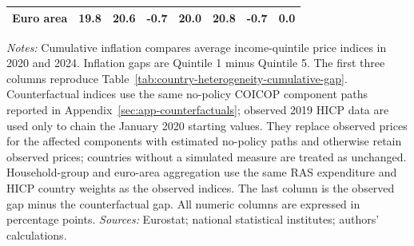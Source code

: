 \begin{table}[H]
{\begin{tabular}{lrrrrrrr}
\textbf{Euro area} & \textbf{19.8} & \textbf{20.6} & \textbf{-0.7} & \textbf{20.0} & \textbf{20.8} & \textbf{-0.7} & \textbf{0.0}\\
\bottomrule
\end{tabular}%
}
\begin{flushleft}
\footnotesize{\emph{Notes:} Cumulative inflation compares average income-quintile price indices in 2020 and 2024. Inflation gaps are Quintile 1 minus Quintile 5. The first three columns reproduce Table~\ref{tab:country-heterogeneity-cumulative-gap}. Counterfactual indices use the same no-policy COICOP component paths reported in Appendix~\ref{sec:app-counterfactuals}; observed 2019 HICP data are used only to chain the January 2020 starting values. They replace observed prices for the affected components with estimated no-policy paths and otherwise retain observed prices; countries without a simulated measure are treated as unchanged. Household-group and euro-area aggregation use the same RAS expenditure and HICP country weights as the observed indices. The last column is the observed gap minus the counterfactual gap. All numeric columns are expressed in percentage points. \emph{Sources:} Eurostat; national statistical institutes; authors' calculations.}
\end{flushleft}
\end{table}
